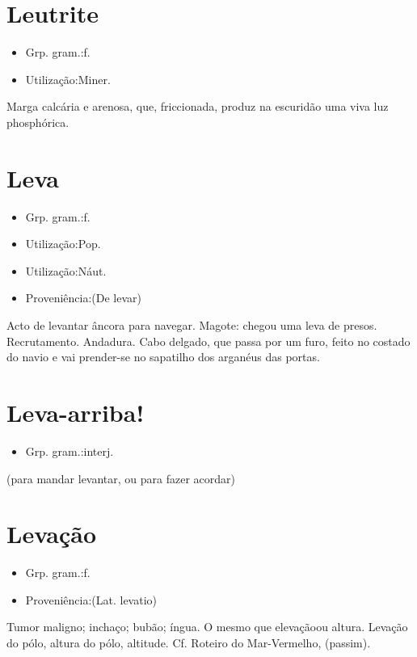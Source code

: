 \section{Leutrite}
\begin{itemize}
\item {Grp. gram.:f.}
\end{itemize}
\begin{itemize}
\item {Utilização:Miner.}
\end{itemize}
Marga calcária e arenosa, que, friccionada, produz na escuridão uma viva luz phosphórica.
\section{Leva}
\begin{itemize}
\item {Grp. gram.:f.}
\end{itemize}
\begin{itemize}
\item {Utilização:Pop.}
\end{itemize}
\begin{itemize}
\item {Utilização:Náut.}
\end{itemize}
\begin{itemize}
\item {Proveniência:(De \textunderscore levar\textunderscore )}
\end{itemize}
Acto de levantar âncora para navegar.
Magote: \textunderscore chegou uma leva de presos\textunderscore .
Recrutamento.
Andadura.
Cabo delgado, que passa por um furo, feito no costado do navio e vai prender-se no sapatilho dos arganéus das portas.
\section{Leva-arriba!}
\begin{itemize}
\item {Grp. gram.:interj.}
\end{itemize}
(para mandar levantar, ou para fazer acordar)
\section{Levação}
\begin{itemize}
\item {Grp. gram.:f.}
\end{itemize}
\begin{itemize}
\item {Proveniência:(Lat. \textunderscore levatio\textunderscore )}
\end{itemize}
Tumor maligno; inchaço; bubão; íngua.
O mesmo que \textunderscore elevação\textunderscore  ou \textunderscore altura\textunderscore .
\textunderscore Levação do pólo\textunderscore , altura do pólo, altitude. Cf. \textunderscore Roteiro do Mar-Vermelho\textunderscore , (passim).
